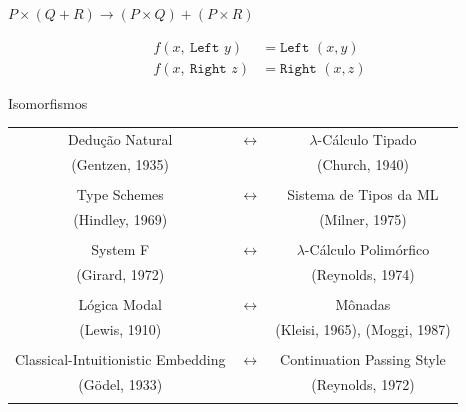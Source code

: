 \documentclass{beamer}
\begin{document}
\begin{frame}{$P \times (Q + R) \rightarrow (P \times Q) + (P \times R) $}

\begin{align*}
f (x, ~\texttt{Left } y) &= \texttt{Left } (x, y)\\
f (x, ~\texttt{Right } z) &= \texttt{Right } (x, z) 
\end{align*}

\end{frame}



\begin{frame}{Isomorfismos}

\begin{block}{}

\begin{center}
\begin{tabular}{ c c c }
\pause
 Dedução Natural & $\longleftrightarrow$ & $\lambda$-Cálculo Tipado \\ 
 (Gentzen, 1935) &  & (Church, 1940) \\  
                 &  &  \\
\pause 
 Type Schemes & $\longleftrightarrow$ & Sistema de Tipos da ML \\ 
 (Hindley, 1969) &  & (Milner, 1975) \\  
                 &  &  \\
\pause
 System F & $\longleftrightarrow$ & $\lambda$-Cálculo Polimórfico \\ 
 (Girard, 1972) &  & (Reynolds, 1974) \\  
                &  &  \\
\pause
 Lógica Modal & $\longleftrightarrow$ & Mônadas \\ 
 (Lewis, 1910) &  & (Kleisi, 1965), (Moggi, 1987) \\  
               &  &    \\
\pause
 Classical-Intuitionistic Embedding & $\longleftrightarrow$ & Continuation Passing Style \\ 
 (Gödel, 1933) &  & (Reynolds, 1972) \\  
               &  &   
\end{tabular}
\end{center}

\end{block}

\end{frame}

\end{document}
